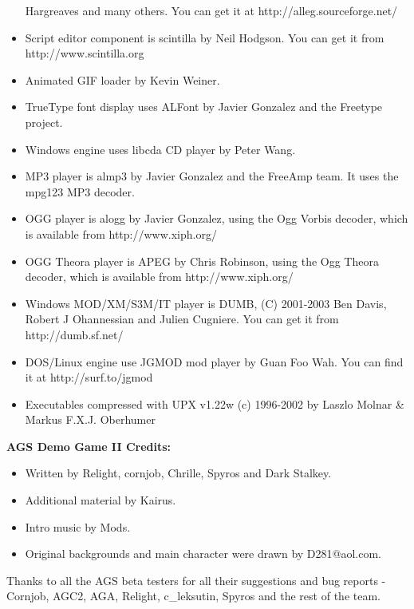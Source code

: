 \begin{itemize}
  Hargreaves and many others. You can get it at
  http://alleg.sourceforge.net/
\item Script editor component is scintilla by Neil Hodgson. You can get it from http://www.scintilla.org
\item Animated GIF loader by Kevin Weiner.
\item TrueType font display uses ALFont by Javier Gonzalez and the Freetype project.
\item Windows engine uses libcda CD player by Peter Wang.
\item MP3 player is almp3 by Javier Gonzalez and the FreeAmp team. It uses the mpg123 MP3 decoder.
\item OGG player is alogg by Javier Gonzalez, using the Ogg Vorbis decoder, which is available
from http://www.xiph.org/
\item OGG Theora player is APEG by Chris Robinson, using the Ogg Theora decoder, which is available
from http://www.xiph.org/
\item Windows MOD/XM/S3M/IT player is DUMB, (C) 2001-2003 Ben Davis, Robert J Ohannessian and Julien Cugniere. You
can get it from http://dumb.sf.net/
\item DOS/Linux engine use JGMOD mod player by Guan Foo Wah. You can find it at
  http://surf.to/jgmod
\item Executables compressed with UPX v1.22w (c) 1996-2002 by Laszlo Molnar & Markus F.X.J. Oberhumer
\end{itemize}

\bf{AGS Demo Game II Credits:}

\begin{itemize}
\item Written by Relight, cornjob, Chrille, Spyros and Dark Stalkey.
\item Additional material by Kairus.
\item Intro music by Mods.
\item Original backgrounds and main character were drawn by D281@aol.com.
\end{itemize}

Thanks to all the AGS beta testers for all their suggestions and bug reports -
Cornjob, AGC2, AGA, Relight, c_leksutin, Spyros and the rest of the team.



